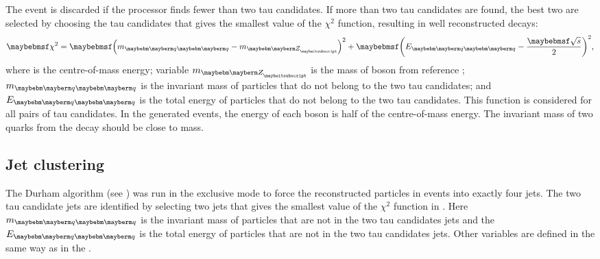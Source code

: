 The event is discarded if the \BonoTauFinder processor finds fewer than two tau candidates. If more than two tau candidates are found, the best two are selected by choosing the tau candidates that gives the smallest value of the $\chi^2$ function, resulting in well reconstructed \ZToqq decays:
\begin{equation}
\chi^2 = {\parenths{m_{\Pquark\Pquark} - m_{\PZ}}^2}+ {\parenths{E_{\Pquark\Pquark} - \frac{\sqrtS}{2}}^2},
\label{eq:tauMinimiser}
\end{equation}
where \sqrtS is the centre-of-mass energy;   variable $m_{\PZ}$ is the mass of \PZ boson from reference \cite{Agashe:2014kda};  $m_{\Pquark\Pquark}$ is the invariant mass of particles that do not belong to the two tau candidates; and  $E_{\Pquark\Pquark}$ is  the total energy of particles that do not belong to the two tau candidates. This function is considered for all pairs of tau candidates.  In the generated \eeZZQQ events, the energy of each \PZ boson is half of the centre-of-mass energy. The invariant mass of two quarks from the \PZ decay should be close to \PZ mass.







\subsection{Jet clustering}


The Durham algorithm  (see ) was run in the exclusive mode to force the reconstructed particles in \eeZZQQ events into exactly four jets. The two tau candidate jets are identified by selecting two jets that gives the smallest value of the $\chi^2$ function in . Here $m_{\Pquark\Pquark}$ is the invariant mass of particles that are not in the two tau candidates jets and the $E_{\Pquark\Pquark}$ is  the total energy of particles that are not in the two tau candidates jets. Other variables are defined in the same way as in the .




